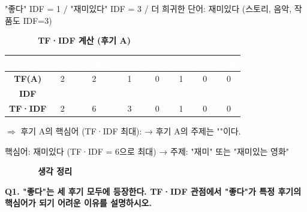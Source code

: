\documentclass[a4paper,11pt]{article}
\begin{document}
\noindent\small\color{gray} "좋다" IDF = 1  /  "재미있다" IDF = 3  /  더 희귀한 단어: 재미있다 (스토리, 음악, 작품도 IDF=3)
\par\vspace{3mm}
\noindent
\colorbox{badgegray}{\textcolor{white}{\small\bfseries STEP 4}}\enspace\textbf{TF·IDF 계산 (후기 A)}
\par\vspace{1mm}
\begin{center}
\renewcommand{\arraystretch}{1.4}
\begin{tabular}{|c|c|c|c|c|c|c|c|}
\hline
\cellcolor{badgegray}\textcolor{white}{\small\bfseries 단어} & \cellcolor{badgegray}\textcolor{white}{\small\bfseries 영화} & \cellcolor{badgegray}\textcolor{white}{\small\bfseries 재미있다} & \cellcolor{badgegray}\textcolor{white}{\small\bfseries 스토리} & \cellcolor{badgegray}\textcolor{white}{\small\bfseries 연기} & \cellcolor{badgegray}\textcolor{white}{\small\bfseries 좋다} & \cellcolor{badgegray}\textcolor{white}{\small\bfseries 음악} & \cellcolor{badgegray}\textcolor{white}{\small\bfseries 작품} \\ \hline
\cellcolor{stepbg}\bfseries TF(A) & \cellcolor{stepbg} 2 & \cellcolor{stepbg} 2 & \cellcolor{stepbg} 1 & \cellcolor{stepbg} 0 & \cellcolor{stepbg} 1 & \cellcolor{stepbg} 0 & \cellcolor{stepbg} 0 \\ \hline
\cellcolor{stepbg}\bfseries IDF & \cellcolor{stepbg}{\tiny\color{gray} ↑Step3} & \cellcolor{stepbg}{\tiny\color{gray} ↑} & \cellcolor{stepbg}{\tiny\color{gray} ↑} & \cellcolor{stepbg}{\tiny\color{gray} ↑} & \cellcolor{stepbg}{\tiny\color{gray} ↑} & \cellcolor{stepbg}{\tiny\color{gray} ↑} & \cellcolor{stepbg}{\tiny\color{gray} ↑} \\ \hline
\cellcolor{stepbg}\bfseries TF·IDF & \cellcolor{answerbg} 2 & \cellcolor{answerbg} 6 & \cellcolor{answerbg} 3 & \cellcolor{answerbg} 0 & \cellcolor{answerbg} 1 & \cellcolor{answerbg} 0 & \cellcolor{answerbg} 0 \\ \hline
\end{tabular}
\end{center}
\noindent\small $\Rightarrow$ 후기 A의 핵심어 (TF·IDF 최대): \hspace{25mm}   →   후기 A의 주제는 "\hspace{25mm}"이다.

\noindent\small\color{gray} 핵심어: 재미있다 (TF·IDF = 6으로 최대)  →  주제: "재미" 또는 "재미있는 영화"
\par\vspace{3mm}
\noindent
\colorbox{badgegray}{\textcolor{white}{\small\bfseries STEP 5}}\enspace\textbf{생각 정리}
\par\vspace{1mm}
\noindent\textbf{Q1. "좋다"는 세 후기 모두에 등장한다. TF·IDF 관점에서 "좋다"가 특정 후기의 핵심어가 되기 어려운 이유를 설명하시오.}
\end{document}
